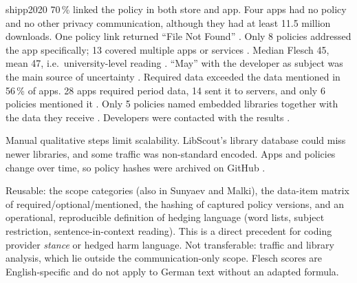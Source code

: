 \begin{papercard}{shipp2020}
 70\,\% linked the policy in both store and app. Four apps had no policy and no other privacy communication, although they had at least 11.5 million downloads. One policy link returned ``File Not Found'' . Only 8 policies addressed the app specifically; 13 covered multiple apps or services . Median Flesch 45, mean 47, i.e.\ university-level reading . ``May'' with the developer as subject was the main source of uncertainty . Required data exceeded the data mentioned in 56\,\% of apps. 28 apps required period data, 14 sent it to servers, and only 6 policies mentioned it . Only 5 policies named embedded libraries together with the data they receive . Developers were contacted with the results .

 Manual qualitative steps limit scalability. LibScout's library database could miss newer libraries, and some traffic was non-standard encoded. Apps and policies change over time, so policy hashes were archived on GitHub .

 Reusable: the scope categories (also in Sunyaev and Malki), the data-item matrix of required/optional/mentioned, the hashing of captured policy versions, and an operational, reproducible definition of hedging language (word lists, subject restriction, sentence-in-context reading). This is a direct precedent for coding provider \emph{stance} or hedged harm language. Not transferable: traffic and library analysis, which lie outside the communication-only scope. Flesch scores are English-specific and do not apply to German text without an adapted formula.
\end{papercard}
